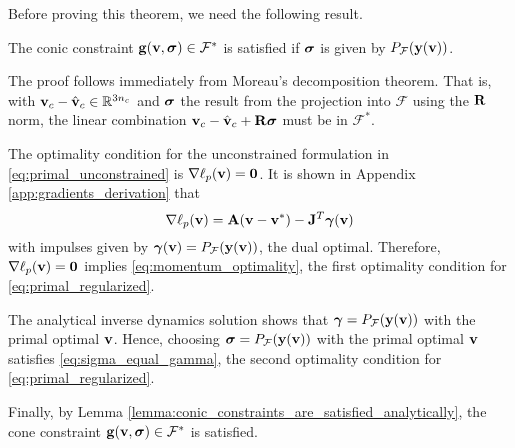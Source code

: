 Before proving this theorem, we need the following result.
\begin{lemma}
    The conic constraint ${\mathbf{g}}({\mathbf{v}}, {\bm\sigma})\in\mathcal{F}^*$ is satisfied
    if ${\bm\sigma}$ is given by $P_\mathcal{F}({\mathbf{y({\mathbf{v}})}})$.
    \label{lemma:conic_constraints_are_satisfied_analytically}
\end{lemma}
\begin{IEEEproof}
    The proof follows immediately from Moreau's decomposition theorem. That is,
    with ${\mathbf{v}}_c - \hat{{\mathbf{v}}}_c\in\mathbb{R}^{3n_c}$ and ${\bm\sigma}$ the
    result from the projection into $\mathcal{F}$ using the ${\mathbf{R}}$ norm, the
    linear combination ${\mathbf{v}}_c - \hat{{\mathbf{v}}}_c + {\mathbf{R}}{\bm\sigma}$ must be in
    $\mathcal{F}^*$.
\end{IEEEproof}
\begin{IEEEproof}
    The optimality condition for the unconstrained formulation in
    \eqref{eq:primal_unconstrained} is $\nabla\ell_p({\mathbf{v}})={\mathbf{0}}$. It is
    shown in Appendix \ref{app:gradients_derivation} that
    \begin{equation*}
        \nabla\ell_p({\mathbf{v}})={\mathbf{A}}({\mathbf{v}}-{\mathbf{v}}^*) - {\mathbf{J}}^T{\bm\gamma}({\mathbf{v}})
    \end{equation*}
    with impulses given by ${\bm\gamma}({\mathbf{v}})=P_\mathcal{F}({\mathbf{y}}({\mathbf{v}}))$,
    the dual optimal. Therefore, $\nabla\ell_p({\mathbf{v}})={\mathbf{0}}$ implies
    \eqref{eq:momentum_optimality}, the first optimality condition for
    \eqref{eq:primal_regularized}.
   
    The analytical inverse dynamics solution shows that
    ${\bm\gamma} = P_\mathcal{F}({\mathbf{y({\mathbf{v}})}})$ with the primal optimal ${\mathbf{v}}$.
    Hence, choosing ${\bm\sigma} = P_\mathcal{F}({\mathbf{y({\mathbf{v}})}})$ with the primal
    optimal ${\mathbf{v}}$ satisfies \eqref{eq:sigma_equal_gamma}, the second
    optimality condition for \eqref{eq:primal_regularized}.

    Finally, by Lemma \ref{lemma:conic_constraints_are_satisfied_analytically},
    the cone constraint ${\mathbf{g}}({\mathbf{v}}, {\bm\sigma})\in\mathcal{F}^*$ is satisfied.
\end{IEEEproof}
